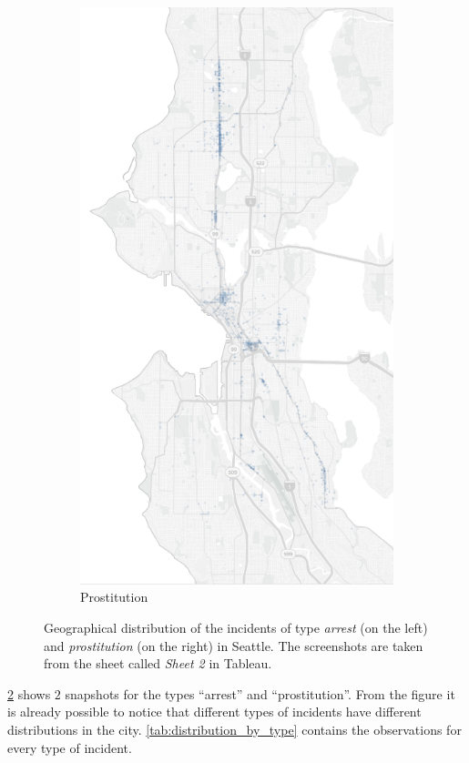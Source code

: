 \begin{figure}[h]
\begin{subfigure}{0.5\textwidth}
        \includegraphics[width=0.9\linewidth]{figures/1_2_geographical_distribution_prostitution}
        \caption{Prostitution}
        \label{fig:1_2_prostitution}
    \end{subfigure}
    \caption{Geographical distribution of the incidents of type \textit{arrest} (on the left) and \textit{prostitution} (on the right) in Seattle. The screenshots are taken from the sheet called \textit{Sheet 2} in Tableau.}
    \label{fig:1_2_geographical_distribution_by_type}
\end{figure}

\cref{fig:1_2_geographical_distribution_by_type} shows $2$ snapshots for the types ``arrest'' and ``prostitution''.
From the figure it is already possible to notice that different types of incidents have different distributions in the city.
\cref{tab:distribution_by_type} contains the observations for every type of incident.

